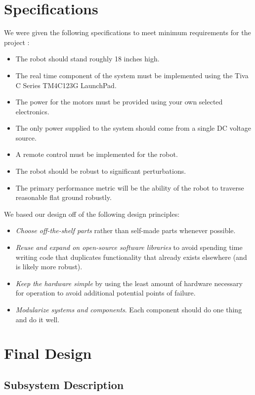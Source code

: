 \documentclass[11pt]{report}
\begin{document}
\begin{spacing}{1.5}
\section*{Specifications}
We were given the following specifications to meet minimum requirements for the project \cite{Requirements}:
\begin{itemize}[noitemsep,nolistsep]
    \item The robot should stand roughly 18 inches high.
    \item The real time component of the system must be implemented using the Tiva C Series TM4C123G LaunchPad.
    \item The power for the motors must be provided using your own selected electronics.
    \item The only power supplied to the system should come from a single DC voltage 
source.
    \item A remote control must be implemented for the robot.
    \item The robot should be robust to significant perturbations.
    \item The primary performance metric will be the ability of the robot to traverse reasonable flat ground robustly. 
\end{itemize}

We based our design off of the following design principles:
\begin{itemize}[noitemsep,nolistsep]
    \item \emph{Choose off-the-shelf parts} rather than self-made parts whenever possible.
    \item \emph{Reuse and expand on open-source software libraries} to avoid spending time writing code that duplicates functionality that already exists elsewhere (and is likely more robust).
    \item \emph{Keep the hardware simple} by using the least amount of hardware necessary for operation to avoid additional potential points of failure.
    \item \emph{Modularize systems and components}. Each component should do one thing and do it well.
\end{itemize}

\section*{Final Design}

    \subsection*{Subsystem Description}
    

\end{spacing}
\end{document}
